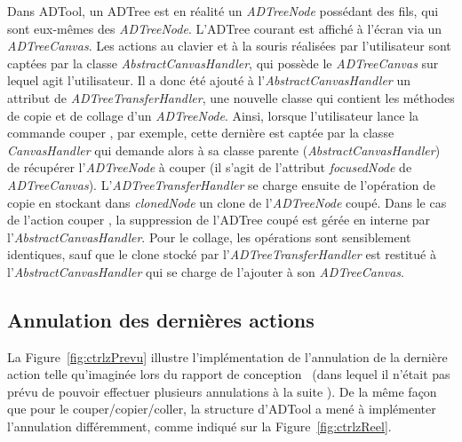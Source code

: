         Dans ADTool, un ADTree est en réalité un \emph{ADTreeNode} possédant des fils, qui sont eux-mêmes des \emph{ADTreeNode}. L'ADTree courant est affiché à l'écran via un \emph{ADTreeCanvas}. Les actions au clavier et à la souris réalisées par l'utilisateur sont captées par la classe \emph{AbstractCanvasHandler}, qui possède le \emph{ADTreeCanvas} sur lequel agit l'utilisateur. Il a donc été ajouté à l'\emph{AbstractCanvasHandler} un attribut de \emph{ADTreeTransferHandler}, une nouvelle classe qui contient les méthodes de copie et de collage d'un \emph{ADTreeNode}. Ainsi, lorsque l'utilisateur lance la commande \og couper \fg{}, par exemple, cette dernière est captée par la classe \emph{CanvasHandler} qui demande alors à sa classe parente (\emph{AbstractCanvasHandler}) de récupérer l'\emph{ADTreeNode} à couper (il s'agit de l'attribut \emph{focusedNode} de \emph{ADTreeCanvas}). L'\emph{ADTreeTransferHandler} se charge ensuite de l'opération de copie en stockant dans \emph{clonedNode} un clone de l'\emph{ADTreeNode} coupé. Dans le cas de l'action \og couper \fg{}, la suppression de l'ADTree coupé est gérée en interne par l'\emph{AbstractCanvasHandler}. Pour le collage, les opérations sont sensiblement identiques, sauf que le clone stocké par l'\emph{ADTreeTransferHandler} est restitué à l'\emph{AbstractCanvasHandler} qui se charge de l'ajouter à son \emph{ADTreeCanvas}.
       
	\subsection{Annulation des dernières actions}

		 La {\sc Figure}~\ref{fig:ctrlzPrevu} illustre l'implémentation de l'annulation de la dernière action telle qu'imaginée lors du rapport de conception~\cite{conception} (dans lequel il n'était pas prévu de pouvoir effectuer plusieurs annulations à la suite ). De la même façon que pour le couper/copier/coller, la structure d'ADTool a mené  à implémenter l'annulation différemment, comme indiqué sur la {\sc Figure}~\ref{fig:ctrlzReel}. 
		 
